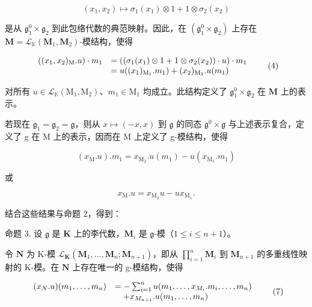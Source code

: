 \[
(x _ {1}, x _ {2}) \mapsto \sigma_ {1} (x _ {1}) \otimes 1 + 1 \otimes \sigma_ {2} (x _ {2})
\]

是从 \(\mathfrak{g}_1^0\times \mathfrak{g}_2\) 到此包络代数的典范映射。因此，在 \((\mathfrak{g}_1^0\times \mathfrak{g}_2)\) 上存在 \(\mathbf{M} = \mathcal{L}_{\mathbb{K}}(\mathbf{M}_1,\mathbf{M}_2)\)-模结构，使得

\[
\begin{array}{r l} ((x _ {1}, x _ {2}) _ {\mathrm{M}}. u) \cdot m _ {1} & = ((\sigma_ {1} (x _ {1}) \otimes 1 + 1 \otimes \sigma_ {2} (x _ {2})) \cdot u) \cdot m _ {1} \\ & = u ((x _ {1}) _ {\mathrm{M} _ {1}}. m _ {1}) + (x _ {2}) _ {\mathrm{M} _ {2}}. u (m _ {1}) \end{array}\tag{4}
\]

对所有 \(u \in \mathcal{L}_{\mathbb{K}}(\mathrm{M}_1, \mathrm{M}_2)\)、\(m_1 \in \mathrm{M}_1\) 均成立。此结构定义了 \(\mathfrak{g}_1^0 \times \mathfrak{g}_2\) 在 \(\mathbf{M}\) 上的表示。

若现在 \(\mathfrak{g}_1 = \mathfrak{g}_2 = \mathfrak{g}\)，则从 \(x \mapsto (-x, x)\) 到 \(\mathfrak{g}\) 的同态 \(\mathfrak{g}^0 \times \mathfrak{g}\) 与上述表示复合，定义了 g 在 M 上的表示，因而在 M 上定义了 g-模结构，使得

\[
(x _ {\mathrm{M}}. u). m _ {1} = x _ {\mathrm{M} _ {2}}. u (m _ {1}) - u (x _ {\mathrm{M} _ {1}}. m _ {1})\tag{5}
\]

或

\[
x _ {\mathrm{M}}. u = x _ {\mathrm{M} _ {2}} u - u x _ {\mathrm{M} _ {1}}.\tag{6}
\]

结合这些结果与命题 2，得到：

命题 3. 设 \(\mathfrak{g}\) 是 \(\mathbf{K}\) 上的李代数，\(\mathbf{M}_i\) 是 \(\mathfrak{g}\)-模（\(1 \leqslant i \leqslant n + 1\)）。

令 \(\mathbf{N}\) 为 K-模 \(\mathcal{L}_{\mathbf{K}}(\mathbf{M}_1, \ldots, \mathbf{M}_n; \mathbf{M}_{n+1})\)，即从 \(\prod_{i=1}^{n} \mathbf{M}_i\) 到 \(\mathbf{M}_{n+1}\) 的多重线性映射的 K-模。在 \(\mathbf{N}\) 上存在唯一的 g-模结构，使得

\[
\begin{array}{r l} (x _ {N}. u) (m _ {1}, \ldots , m _ {n}) & = - \sum_ {i = 1} ^ {n} u (m _ {1}, \ldots , x _ {M _ {i}}. m _ {i}, \ldots , m _ {n}) \\ & \quad + x _ {M _ {n + 1}}. u (m _ {1}, \ldots , m _ {n}) \end{array}\tag{7}
\]

